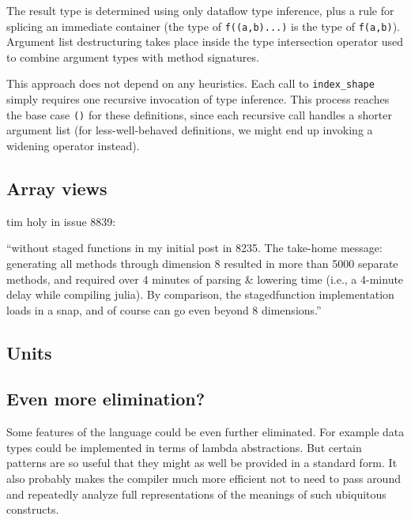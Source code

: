 



The result type is determined using only dataflow type inference, plus a
rule for splicing an immediate container (the type of \texttt{f((a,b)...)} is
the type of \texttt{f(a,b)}). Argument list destructuring takes place inside
the type intersection operator used to combine argument types with method
signatures.

This approach does not depend on any heuristics. Each call to \texttt{index\_shape}
simply requires one recursive invocation of type inference. This process reaches
the base case \texttt{()} for these definitions, since each recursive call
handles a shorter argument list (for less-well-behaved definitions, we might
end up invoking a widening operator instead).



\subsection{Array views}

tim holy in issue 8839:

``without staged functions in my initial post in 8235. The take-home message: generating all methods through dimension 8 resulted in more than 5000 separate methods, and required over 4 minutes of parsing \& lowering time (i.e., a 4-minute delay while compiling julia). By comparison, the stagedfunction implementation loads in a snap, and of course can go even beyond 8 dimensions.''


\subsection{Units}


\subsection{Even more elimination?}

Some features of the language could be even further eliminated. For example data
types could be implemented in terms of lambda abstractions. But certain patterns
are so useful that they might as well be provided in a standard form. It also
probably makes the compiler much more efficient not to need to pass around and
repeatedly analyze full representations of the meanings of such ubiquitous constructs.


